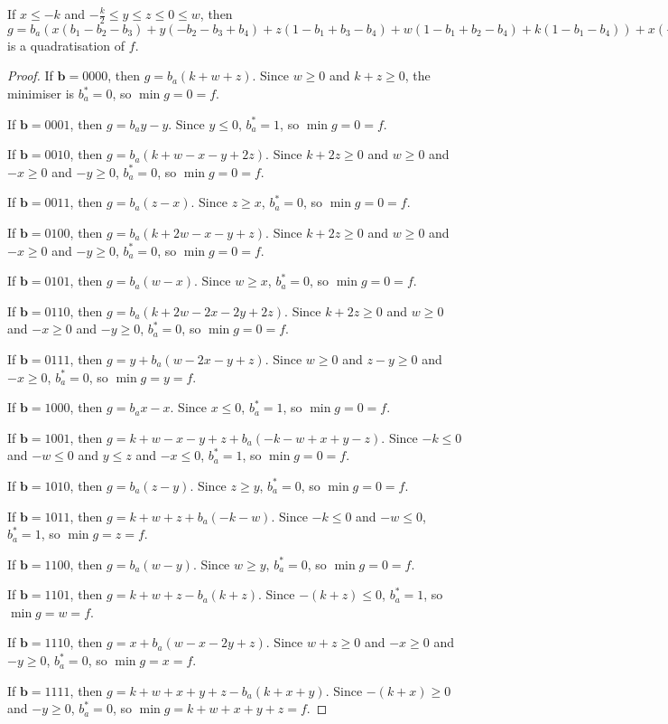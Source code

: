 \documentclass[11pt]{scrartcl}
\newcommand{\vc}[1]{\boldsymbol{#1}}
\begin{document}
\begin{lemma}
	\label{case1}
	If $x\le -k$ and $-\frac{k}{2} \le y \le z \le 0 \le w$, then 
	$g = b_a(x(b_1-b_2-b_3)+y(-b_2-b_3+b_4)+z(1-b_1+b_3-b_4)+w(1-b_1+b_2-b_4)+k(1-b_1-b_4))
+x(-b_1+b_1 b_2+b_1 b_3)+y(-b_4+b_2 b_4+b_3 b_4)+z b_1 b_4 +w b_1 b_4 +k b_1 b_4 $ is a quadratisation of $f$.

\end{lemma}
\begin{proof}
If $\vc b = 0000$, then $g = b_a(k + w + z)$. Since $w \ge 0$ and $k + z \ge 0$, the minimiser is $b_a^*= 0$, so $\min g = 0 = f$.

If $\vc b = 0001$, then $g = b_ay - y$. Since $y \le 0$, $b_a^*= 1$, so $\min g = 0 = f$.

If $\vc b = 0010$, then $g = b_a(k + w - x - y + 2z)$. Since $k + 2z \ge 0$ and $ w \ge 0 $ and $- x\ge 0$ and $-y \ge 0$, $b_a^*= 0$, so $\min g = 0 = f$.

If $\vc b = 0011$, then $g = b_a(z - x)$. Since $z \ge x$, $b_a^*= 0$, so $\min g = 0 = f$.

If $\vc b = 0100$, then $g = b_a(k + 2w - x - y + z)$. Since $k +2z \ge 0$ and $w \ge 0$ and $-x \ge 0 $ and $-y \ge 0$, $b_a^*= 0$, so $\min g = 0 = f$.

If $\vc b = 0101$, then $g = b_a(w - x)$. Since $w \ge x$, $b_a^*= 0$, so $\min g = 0 = f$.

If $\vc b = 0110$, then $g = b_a(k + 2w - 2x - 2y + 2z)$. Since $k + 2z \ge 0$ and $w \ge 0$ and $-x \ge 0$ and $-y \ge 0$, $b_a^*= 0$, so $\min g = 0 = f$.

If $\vc b = 0111$, then $g = y + b_a(w - 2x - y + z)$. Since $w \ge 0$ and $z - y \ge 0$ and $-x \ge 0$, $b_a^*= 0$, so $\min g = y = f$.

If $\vc b = 1000$, then $g = b_ax - x$. Since $x \le 0$, $b_a^*= 1$, so $\min g = 0 = f$.

If $\vc b = 1001$, then $g = k + w - x - y + z +b_a(-k - w + x + y - z)$. Since $-k \le 0 $ and $-w \le 0 $ and $y \le z$ and $-x \le 0$, $b_a^*= 1$, so $\min g = 0 = f$.

If $\vc b = 1010$, then $g = b_a(z - y)$. Since $ z \ge y$, $b_a^*= 0$, so $\min g = 0 = f$.

If $\vc b = 1011$, then $g = k + w + z + b_a(-k - w)$. Since $- k \le 0$ and $-w \le 0$, $b_a^*= 1$, so $\min g = z = f$.

If $\vc b = 1100$, then $g = b_a(w - y)$. Since $w \ge y$, $b_a^*= 0$, so $\min g = 0 = f$.

If $\vc b = 1101$, then $g = k + w + z - b_a(k + z)$. Since $-(k + z) \le 0$, $b_a^*= 1$, so $\min g = w = f$.

If $\vc b = 1110$, then $g = x + b_a(w - x - 2y + z)$. Since $w + z \ge 0$ and $-x \ge 0$ and $-y \ge 0$, $b_a^* = 0$, so $\min g = x = f$.

If $\vc b = 1111$, then $g = k + w + x + y + z - b_a(k + x + y)$. Since $-(k + x) \ge 0$ and $-y \ge 0$, $b_a^*= 0$, so $\min g = k+w+x+y+z = f$.

\end{proof}
\end{document}
